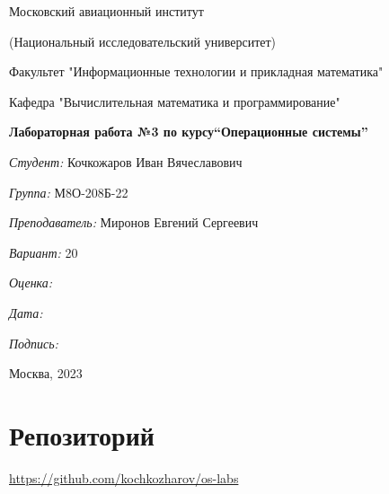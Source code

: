 \documentclass[a4paper, 12pt]{article}
\begin{document}
\thispagestyle{empty}	
\begin{center}
	Московский авиационный институт
	
	(Национальный исследовательский университет)
	
	Факультет "Информационные технологии и прикладная математика"
	
	Кафедра "Вычислительная математика и программирование"
	
\end{center}
\vspace{40ex}
\begin{center}
	\textbf{\large{Лабораторная работа №3 по курсу\linebreak \textquotedblleft Операционные системы\textquotedblright}}
\end{center}
\vspace{35ex}
\begin{flushright}
	\textit{Студент: } Кочкожаров Иван Вячеславович
	
	\vspace{2ex}
	\textit{Группа: } М8О-208Б-22
	
	\vspace{2ex}
	\textit{Преподаватель: } Миронов Евгений Сергеевич
	
	\vspace{2ex}
	\textit{Вариант: } 20 
	
	\vspace{2ex}
	\textit{Оценка: } \underline{\quad\quad\quad\quad\quad\quad}
	
	 \vspace{2ex}
	\textit{Дата: } \underline{\quad\quad\quad\quad\quad\quad}
	
	\vspace{2ex}
	\textit{Подпись: } \underline{\quad\quad\quad\quad\quad\quad}
	
\end{flushright}

\vspace{5ex}

\begin{vfill}
	\begin{center}
		Москва, 2023
	\end{center}	
\end{vfill}
\newpage

\begingroup
\color{black}
\tableofcontents\newpage
\endgroup

\section{Репозиторий}
\href{https://github.com/kochkozharov/os-labs}{https://github.com/kochkozharov/os-labs}
\end{document}
